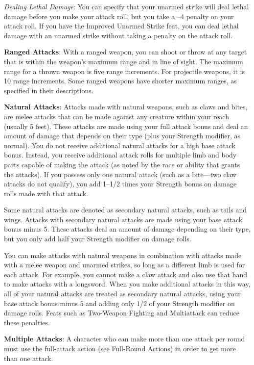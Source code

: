 \textit{Dealing Lethal Damage}: You can specify that your unarmed strike will deal lethal damage before you make your attack roll, but you take a --4 penalty on your attack roll. If you have the Improved Unarmed Strike feat, you can deal lethal damage with an unarmed strike without taking a penalty on the attack roll.
				
\textbf{Ranged Attacks}: With a ranged weapon, you can shoot or throw at any target that is within the weapon's maximum range and in line of sight. The maximum range for a thrown weapon is five range increments. For projectile weapons, it is 10 range increments. Some ranged weapons have shorter maximum ranges, as specified in their descriptions.
				
\textbf{Natural Attacks}: Attacks made with natural weapons, such as claws and bites, are melee attacks that can be made against any creature within your reach (usually 5 feet). These attacks are made using your full attack bonus and deal an amount of damage that depends on their type (plus your Strength modifier, as normal). You do not receive additional natural attacks for a high base attack bonus. Instead, you receive additional attack rolls for multiple limb and body parts capable of making the attack (as noted by the race or ability that grants the attacks). If you possess only one natural attack (such as a bite---two claw attacks do not qualify), you add 1--1/2 times your Strength bonus on damage rolls made with that attack.
				
Some natural attacks are denoted as secondary natural attacks, such as tails and wings. Attacks with secondary natural attacks are made using your base attack bonus minus 5. These attacks deal an amount of damage depending on their type, but you only add half your Strength modifier on damage rolls.
				
 You can make attacks with natural weapons in combination with attacks made with a melee weapon and unarmed strikes, so long as a different limb is used for each attack. For example, you cannot make a claw attack and also use that hand to make attacks with a longsword. When you make additional attacks in this way, all of your natural attacks are treated as secondary natural attacks, using your base attack bonus minus 5 and adding only 1/2 of your Strength modifier on damage rolls. Feats such as Two-Weapon Fighting and Multiattack can reduce these penalties.
				
\textbf{Multiple Attacks}: A character who can make more than one attack per round must use the full-attack action (see Full-Round Actions) in order to get more than one attack.
				
